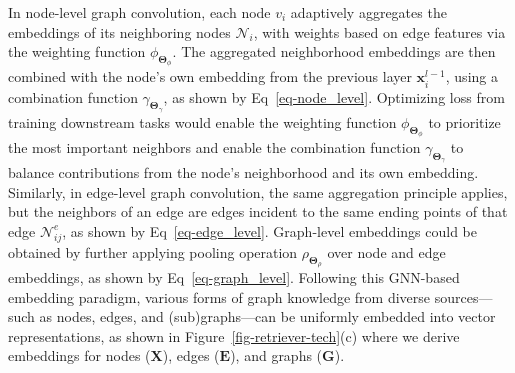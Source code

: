 In node-level graph convolution, each node $v_i$ adaptively aggregates the embeddings of its neighboring nodes $\mathcal{N}_i$, with weights based on edge features via the weighting function $\phi_{\boldsymbol{\Theta}_{\phi}}$. The aggregated neighborhood embeddings are then combined with the node's own embedding from the previous layer $\mathbf{x}_i^{l-1}$, using a combination function $\gamma_{\boldsymbol{\Theta}_{\gamma}}$, as shown by Eq~\eqref{eq-node_level}. Optimizing loss from training downstream tasks would enable the weighting function $\phi_{\boldsymbol{\Theta}_{\phi}}$ to prioritize the most important neighbors and enable the combination function $\gamma_{\boldsymbol{\Theta}_{\gamma}}$ to balance contributions from the node’s neighborhood and its own embedding. Similarly, in edge-level graph convolution, the same aggregation principle applies, but the neighbors of an edge are edges incident to the same ending points of that edge $\mathcal{N}^e_{ij}$, as shown by Eq~\eqref{eq-edge_level}. Graph-level embeddings could be obtained by further applying pooling operation $\rho_{\boldsymbol{\Theta}_{\rho}}$ over node and edge embeddings, as shown by Eq~\eqref{eq-graph_level}. Following this GNN-based embedding paradigm, various forms of graph knowledge from diverse sources—such as nodes, edges, and (sub)graphs—can be uniformly embedded into vector representations, as shown in Figure~\ref{fig-retriever-tech}(c) where we derive embeddings for nodes ($\mathbf{X}$), edges ($\mathbf{E}$), and graphs ($\mathbf{G}$). 


